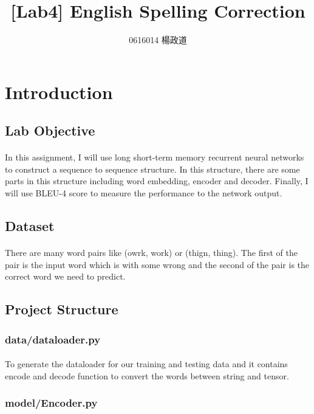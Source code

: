 \title{[Lab4] English Spelling Correction}
\author{0616014 楊政道}
\maketitle
\thispagestyle{fancy}
\section{Introduction}
\subsection{Lab Objective}
\paragraph{}
In this assignment, I will use long short-term memory recurrent neural networks to construct a sequence to sequence structure. In this structure, there are some parts in this structure including word embedding, encoder and decoder. Finally, I will use BLEU-4 score to measure the performance to the network output.
\subsection{Dataset}
\paragraph{}
There are many word pairs like (owrk, work) or (thign, thing). The first of the pair is the input word which is with some wrong and the second of the pair is the correct word we need to predict.
\subsection{Project Structure}
\subsubsection{data/dataloader.py}
\paragraph{}
To generate the dataloader for our training and testing data and it contains encode and decode function to convert the words between string and tensor.
\subsubsection{model/Encoder.py}

